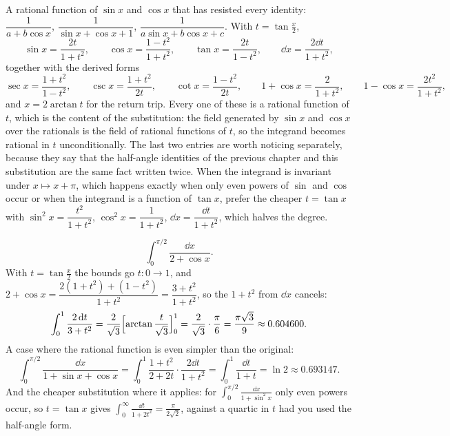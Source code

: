 \cue A rational function of $\sin x$ and $\cos x$ that has resisted every identity: $\dfrac{1}{a+b\cos x}$, $\dfrac{1}{\sin x+\cos x+1}$, $\dfrac{1}{a\sin x+b\cos x+c}$.
\method With $t=\tan\tfrac x2$,
\[
\sin x=\frac{2t}{1+t^2},\qquad \cos x=\frac{1-t^2}{1+t^2},\qquad \tan x=\frac{2t}{1-t^2},\qquad \dd x=\frac{2\dd t}{1+t^2},
\]
together with the derived forms
\[
\sec x=\frac{1+t^2}{1-t^2},\qquad \csc x=\frac{1+t^2}{2t},\qquad \cot x=\frac{1-t^2}{2t},\qquad
1+\cos x=\frac{2}{1+t^2},\qquad 1-\cos x=\frac{2t^2}{1+t^2},
\]
and $x=2\arctan t$ for the return trip. Every one of these is a rational function of $t$, which is the content of the substitution: the field generated by $\sin x$ and $\cos x$ over the rationals is the field of rational functions of $t$, so the integrand becomes rational in $t$ unconditionally. The last two entries are worth noticing separately, because they say that the half-angle identities of the previous chapter and this substitution are the same fact written twice. When the integrand is invariant under $x\mapsto x+\pi$, which happens exactly when only even powers of $\sin$ and $\cos$ occur or when the integrand is a function of $\tan x$, prefer the cheaper $t=\tan x$ with $\sin^2x=\dfrac{t^2}{1+t^2}$, $\cos^2x=\dfrac{1}{1+t^2}$, $\dd x=\dfrac{\dd t}{1+t^2}$, which halves the degree.

\begin{worked}
\[
\int_0^{\pi/2}\frac{\dd x}{2+\cos x} .
\]
With $t=\tan\tfrac x2$ the bounds go $t:0\to1$, and $2+\cos x=\dfrac{2(1+t^2)+(1-t^2)}{1+t^2}=\dfrac{3+t^2}{1+t^2}$, so the $1+t^2$ from $\dd x$ cancels:
\[
\int_0^1\frac{2\,\mathrm{d} t}{3+t^2}=\frac{2}{\sqrt3}\Bigl[\arctan\frac{t}{\sqrt3}\Bigr]_0^1=\frac{2}{\sqrt3}\cdot\frac{\pi}{6}=\frac{\pi\sqrt3}{9}\approx0.604600 .
\]
A case where the rational function is even simpler than the original:
\[
\int_0^{\pi/2}\frac{\dd x}{1+\sin x+\cos x}=\int_0^1\frac{1+t^2}{2+2t}\cdot\frac{2\dd t}{1+t^2}=\int_0^1\frac{\dd t}{1+t}=\ln2\approx0.693147 .
\]
And the cheaper substitution where it applies: for $\displaystyle\int_0^{\pi/2}\frac{\dd x}{1+\sin^2x}$ only even powers occur, so $t=\tan x$ gives $\int_0^{\infty}\frac{\dd t}{1+2t^2}=\frac{\pi}{2\sqrt2}$, against a quartic in $t$ had you used the half-angle form.
\end{worked}

